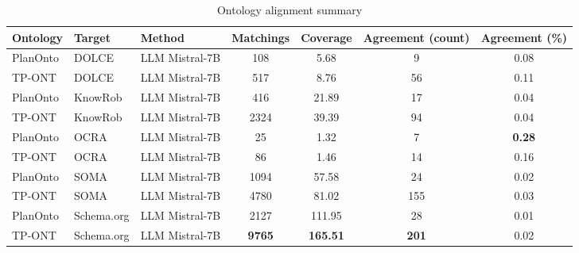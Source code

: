 
                \begin{table}[t]
                \centering
                \begin{tabular}{lllcccc}
\toprule
Ontology & Target & Method & Matchings & Coverage & Agreement (count) & Agreement (\%) \\
\midrule
PlanOnto & DOLCE & LLM Mistral-7B & 108 & 5.68 & 9 & 0.08 \\
TP-ONT & DOLCE & LLM Mistral-7B & 517 & 8.76 & 56 & 0.11 \\
PlanOnto & KnowRob & LLM Mistral-7B & 416 & 21.89 & 17 & 0.04 \\
TP-ONT & KnowRob & LLM Mistral-7B & 2324 & 39.39 & 94 & 0.04 \\
PlanOnto & OCRA & LLM Mistral-7B & 25 & 1.32 & 7 & \textbf{0.28} \\
TP-ONT & OCRA & LLM Mistral-7B & 86 & 1.46 & 14 & 0.16 \\
PlanOnto & SOMA & LLM Mistral-7B & 1094 & 57.58 & 24 & 0.02 \\
TP-ONT & SOMA & LLM Mistral-7B & 4780 & 81.02 & 155 & 0.03 \\
PlanOnto & Schema.org & LLM Mistral-7B & 2127 & 111.95 & 28 & 0.01 \\
TP-ONT & Schema.org & LLM Mistral-7B & \textbf{9765} & \textbf{165.51} & \textbf{201} & 0.02 \\
\bottomrule
\end{tabular}

                \caption{Ontology alignment summary}
                \label{tab:alignment_summary}
                \end{table}
            